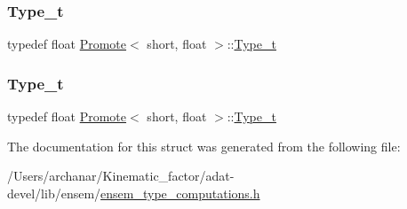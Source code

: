 \subsubsection{\texorpdfstring{Type\_t}{Type\_t}\hspace{0.1cm}{\footnotesize\ttfamily [2/3]}}
{\footnotesize\ttfamily typedef float \mbox{\hyperlink{structPromote}{Promote}}$<$ short, float $>$\+::\mbox{\hyperlink{structPromote_3_01short_00_01float_01_4_a6c280bd9d625add9fbe42ad7517e59d7}{Type\+\_\+t}}}

\mbox{\label{structPromote_3_01short_00_01float_01_4_a6c280bd9d625add9fbe42ad7517e59d7}} 
\subsubsection{\texorpdfstring{Type\_t}{Type\_t}\hspace{0.1cm}{\footnotesize\ttfamily [3/3]}}
{\footnotesize\ttfamily typedef float \mbox{\hyperlink{structPromote}{Promote}}$<$ short, float $>$\+::\mbox{\hyperlink{structPromote_3_01short_00_01float_01_4_a6c280bd9d625add9fbe42ad7517e59d7}{Type\+\_\+t}}}



The documentation for this struct was generated from the following file\+:\begin{DoxyCompactItemize}
\item 
/\+Users/archanar/\+Kinematic\+\_\+factor/adat-\/devel/lib/ensem/\mbox{\hyperlink{adat-devel_2lib_2ensem_2ensem__type__computations_8h}{ensem\+\_\+type\+\_\+computations.\+h}}\end{DoxyCompactItemize}
